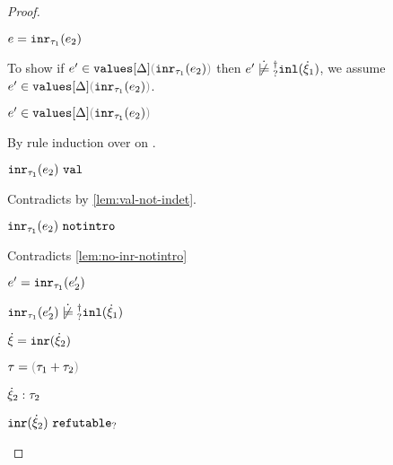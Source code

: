 \begin{proof}
\begin{byCases}
\begin{byCases}
\begin{byCases}
\begin{pfsteps*}
          \item $e=\mathtt{inr}_{\tau_1}({e_2})$ 
          \end{pfsteps*}
          To show if $\inValues{e'}{\Delta}{\hinr{\tau_1}{e_2}}$ then $\cnotsatisfyormay{e'}{\cinl{\hxi_1}}$, we assume $\inValues{e'}{\Delta}{\hinr{\tau_1}{e_2}}$.
          \begin{pfsteps*}
          \item $\inValues{e'}{\Delta}{\hinr{\tau_1}{e_2}}$  
          \end{pfsteps*}
          By rule induction over  on .
          \begin{byCases}
            \item[\text{(\ref{rule:IVVal})}]
            \begin{pfsteps*}
            \item $\mathtt{inr}_{\tau_1}({e_2}) ~\mathtt{val}$ 
            \end{pfsteps*} 
            Contradicts  by \autoref{lem:val-not-indet}.
            \item[\text{(\ref{rule:IVIndet})}] 
            \begin{pfsteps*}
            \item $\mathtt{inr}_{\tau_1}({e_2}) ~\mathtt{notintro}$ 
            \end{pfsteps*} 
            Contradicts \autoref{lem:no-inr-notintro}
            \item[\text{(\ref{rule:IVInr})}] 
            \begin{pfsteps*}
            \item $e'=\mathtt{inr}_{\tau_1}({e_2'})$ 
            \item $\cnotsatisfyormay{\hinr{\tau_1}{e_2'}}{\cinl{\hxi_1}}$ 
            \end{pfsteps*} 
          \end{byCases}
        \end{byCases} 
      \end{byCases}
    \item[\text{(\ref{rule:CTInr})}]
    \begin{pfsteps*}
      \item $\dot{\xi} = \mathtt{inr}(\dot{\xi}_2)$ 
      \item $\tau = \tsum{\tau_1}{\tau_2}$ 
      \item $\dot{\xi}_2 : \tau_2$  
      \item $\mathtt{inr}(\dot{\xi}_2) ~\mathtt{refutable}_?$  
      \end{pfsteps*}


\end{byCases}
\end{proof}
